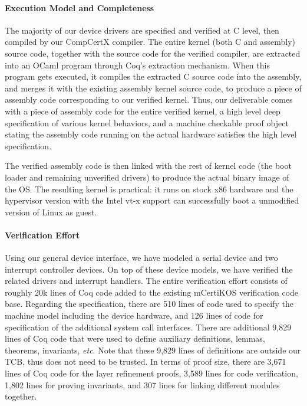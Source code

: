 \paragraph{Execution Model and Completeness}
The majority of our device drivers are specified and verified at C
level, then compiled by our CompCertX compiler. 
The entire kernel (both C and assembly)
source code, together with the source code for the verified compiler,
are extracted into an OCaml program through Coq's extraction
mechanism. When this program gets executed, it compiles the extracted
C source code into the assembly, and merges it with the existing
assembly kernel source code, to produce a piece of assembly code
corresponding to our verified kernel.  Thus, our deliverable comes
with a piece of assembly code for the entire verified kernel, a high
level deep specification of various kernel behaviors, and a machine
checkable proof object stating the assembly code running on the actual
hardware satisfies the high level specification.

The verified assembly code is then linked with the rest of kernel code
(the boot loader and remaining unverified drivers) to produce the
actual binary image of the OS. The resulting kernel is practical: it
runs on stock x86 hardware and the hypervisor version with the Intel vt-x
support can successfully boot a unmodified version of Linux as guest.

\paragraph{Verification Effort} 
Using our general device interface, we have modeled a serial device
and two interrupt controller devices. On top of these device models,
we have verified the related drivers and interrupt handlers.  The
entire verification effort consists of roughly 20k lines of Coq code
added to the existing mCertiKOS verification code base.  Regarding the
specification, there are 510 lines of code used to specify the machine
model including the device hardware, and 126 lines of code for
specification of the additional system call interfaces. There are
additional 9,829 lines of Coq code that were used to define auxiliary
definitions, lemmas, theorems, invariants, {\it{}etc}. Note that these
9,829 lines of definitions are outside our TCB, thus does not need
to be trusted.  In terms of proof size, there are 3,671 lines of Coq
code for the layer refinement proofs, 3,589 lines for code
verification, 1,802 lines for proving invariants, and 307 lines for
linking different modules together.

